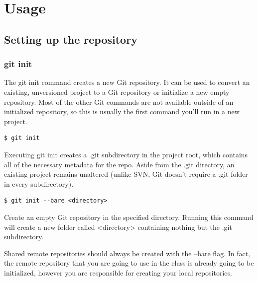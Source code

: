 \documentclass{article}
\begin{document}

\section{Usage}

\subsection{Setting up the repository}

\subsubsection*{git init}

The git init command creates a new Git repository. It can be used to
convert an existing, unversioned project to a Git repository or
initialize a new empty repository. Most of the other Git commands are
not available outside of an initialized repository, so this is usually
the first command you'll run in a new project. 

\begin{lstlisting}
$ git init
\end{lstlisting}

Executing git init creates a .git subdirectory in the project root,
which contains all of the necessary metadata for the repo. Aside from
the .git directory, an existing project remains unaltered (unlike SVN,
Git doesn't require a .git folder in every subdirectory). 

\begin{lstlisting}
$ git init --bare <directory>
\end{lstlisting}

Create an empty Git repository in the specified directory. Running
this command will create a new folder called <directory> containing
nothing but the .git subdirectory.

Shared remote repositories should always be created with the --bare
flag. In fact, the remote repository that you are going to use in the
class is already going to be initialized, however you are responsible
for creating your local repositories.
\end{document}
